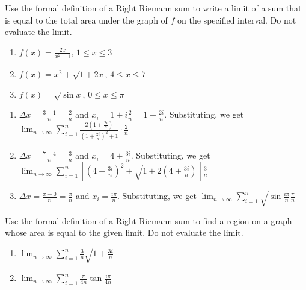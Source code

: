 \begin{Exercise}[label=limsum1]
	Use the formal definition of a Right Riemann sum to write a limit of a sum that is equal to the total area under the graph of $f$ on the specified interval. Do not evaluate the limit.
	\begin{enumerate}
		\item $f(x) = \frac{2x}{x^2+1}\text{, } 1 \leq x \leq 3$
		\item $f(x) = x^2+\sqrt{1+2x}\text{, } 4 \leq x \leq 7$
		\item $f(x) = \sqrt{\sin{x}}\text{, } 0 \leq x \leq \pi$
	\end{enumerate}
\end{Exercise}

\begin{Answer}[ref=limsum1]
	\begin{enumerate}
		\item $\Delta x = \frac{3-1}{n}=\frac{2}{n}$ and $x_i = 1+i\frac{2}{n}=1+\frac{2i}{n}$. Substituting, we get $\lim_{n\to\infty}\sum_{i=1}^{n}\frac{2(1+\frac{2i}{n})}{(1+\frac{2i}{n})^2+1} \cdot \frac{2}{n}$
		\item $\Delta x = \frac{7-4}{n}=\frac{3}{n}$ and $x_i = 4+\frac{3i}{n}$. Substituting, we get $\lim_{n\to \infty}\sum_{i=1}^{n}[(4+\frac{3i}{n})^2+\sqrt{1+2(4+\frac{3i}{n})}]\frac{3}{n}$
		\item $\Delta x = \frac{\pi-0}{n}=\frac{\pi}{n}$ and $x_i = \frac{i\pi}{n}$. Substituting, we get $\lim_{n \to \infty}\sum_{i=1}^{n}\sqrt{\sin{\frac{i\pi}{n}}}\frac{\pi}{n}$
	\end{enumerate}
\end{Answer}

\begin{Exercise}[label=limsum2]
	Use the formal definition of a Right Riemann sum to find a region on a graph whose area is equal to the given limit. Do not evaluate the limit.
	\begin{enumerate}
		\item $\lim_{n\to \infty} \sum_{i=1}^{n}\frac{3}{n}\sqrt{1+\frac{3i}{n}}$
		\item $\lim_{n\to\infty} \sum_{i=1}^{n}\frac{\pi}{4n}\tan{\frac{i\pi}{4n}}$
	\end{enumerate}
\end{Exercise}

